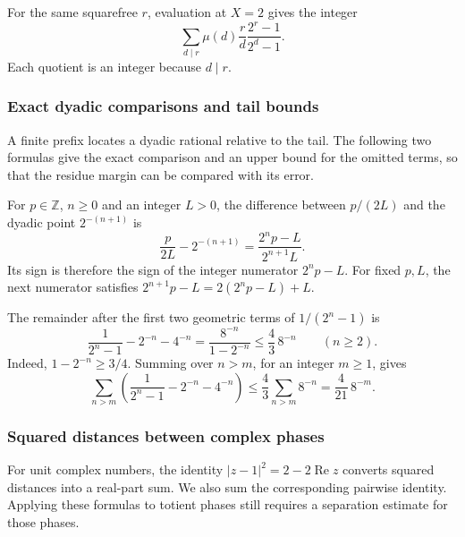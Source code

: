 \begin{cor}\label{cor:numerator-polynomial-explicit-positive-coefficients}
For the same squarefree $r$, evaluation at $X=2$ gives the integer
\[
 \sum_{d\mid r}\mu(d)\frac rd\frac{2^r-1}{2^d-1}.
\]
Each quotient is an integer because $d\mid r$.
\end{cor}

\subsubsection{Exact dyadic comparisons and tail bounds}

A finite prefix locates a dyadic rational relative to the tail.
The following two formulas give the exact comparison and an upper bound
for the omitted terms, so that the residue margin can be compared with
its error.


\begin{defn}
For $p\in\mathbb Z$, $n\ge0$ and an integer $L>0$, the difference
between $p/(2L)$ and the dyadic point $2^{-(n+1)}$ is
\[
 \frac{p}{2L}-2^{-(n+1)}=\frac{2^np-L}{2^{n+1}L}.
\]
Its sign is therefore the sign of the integer numerator $2^np-L$.
For fixed $p,L$, the next numerator satisfies
$2^{n+1}p-L=2(2^np-L)+L$.
\quad {}
\end{defn}

\begin{prop}\label{prop:geometric-remainder-bound}
The remainder after the first two geometric terms of $1/(2^n-1)$ is
\[
 \frac1{2^n-1}-2^{-n}-4^{-n}
   =\frac{8^{-n}}{1-2^{-n}}
   \le \frac43\,8^{-n}\qquad(n\ge2).
\]
Indeed, $1-2^{-n}\ge3/4$. Summing over $n>m$, for an integer $m\ge1$, gives
\[
 \sum_{n>m}\left(\frac1{2^n-1}-2^{-n}-4^{-n}\right)
 \le\frac43\sum_{n>m}8^{-n}=\frac4{21}\,8^{-m}.
\]
\end{prop}

\subsubsection{Squared distances between complex phases}

For unit complex numbers, the identity
$|z-1|^2=2-2\operatorname{Re}z$ converts squared distances into a real-part
sum. We also sum the corresponding pairwise identity. Applying these
formulas to totient phases still requires a separation estimate for
those phases.


